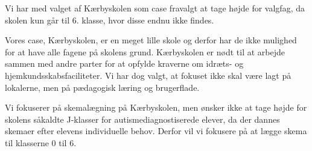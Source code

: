 Vi har med valget af Kærbyskolen som case fravalgt at tage højde for valgfag, da skolen kun går til 6. klasse, hvor disse endnu ikke findes. 

Vores case, Kærbyskolen, er en meget lille skole og derfor har de ikke mulighed for at have alle fagene på skolens grund. Kærbyskolen er nødt til at arbejde sammen med andre parter for at opfylde kraverne om idræts- og hjemkundsskabsfaciliteter. Vi har dog valgt, at fokuset ikke skal være lagt på lokalerne, men på pædagogisk læring og brugerflade.

Vi fokuserer på skemalægning på Kærbyskolen, men ønsker ikke at tage højde for skolens såkaldte J-klasser for autismediagnostiserede elever, da der dannes skemaer efter elevens individuelle behov. Derfor vil vi fokusere på at lægge skema til klasserne 0 til 6.



